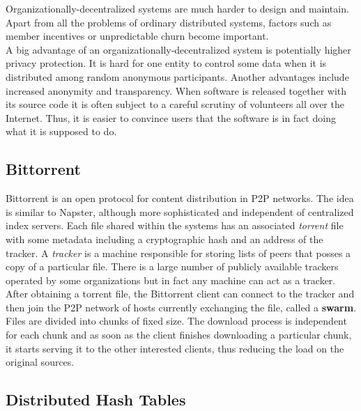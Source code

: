 \documentclass{pracamgren}
\begin{document}
Organizationally-decentralized systems are much harder to design and maintain. Apart from all the problems of ordinary distributed systems, factors such as member incentives or unpredictable churn become important.\\

A big advantage of an organizationally-decentralized system is potentially higher privacy protection. It is hard for one entity to control some data when it is distributed among random anonymous participants.
Another advantages include increased anonymity and transparency. When software is released together with its source code it is often subject to a careful scrutiny of volunteers all over the Internet. Thus, it is easier to convince users that the software is in fact doing what it is supposed to do.\\

\subsection{Bittorrent}

Bittorrent \cite{bittorrent} is an open protocol for content distribution in P2P networks. The idea is similar to Napster, although more sophisticated and independent of centralized index servers. Each file shared within the systems has an associated {\it torrent} file with some metadata including a cryptographic hash and an address of the tracker. A {\it tracker} is a machine responsible for storing lists of peers that posses a copy of a particular file. There is a large number of publicly available trackers operated by some organizations but in fact any machine can act as a tracker.\\

After obtaining a torrent file, the Bittorrent client can connect to the tracker and then join the P2P network of hosts currently exchanging the file, called a {\bf swarm}. Files are divided into chunks of fixed size. The download process is independent for each chunk and as soon as the client finishes downloading a particular chunk, it starts serving it to the other interested clients, thus reducing the load on the original sources.\\

\subsection{Distributed Hash Tables}
\end{document}
